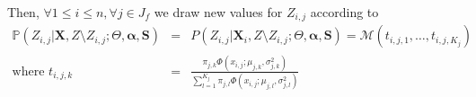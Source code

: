 \documentclass[12pt,a4paper]{report}
\begin{document}

	Then, $\forall 1\leq i \leq n, \forall j \in J_f$ we draw new values for $Z_{i,j}$ according to
	\begin{eqnarray}
		\mathbb{P}(Z_{i,j}|\boldsymbol{X},Z\setminus Z_{i,j};\Theta,\boldsymbol{\alpha},\boldsymbol{S})&=&P(Z_{i,j}|\boldsymbol{X}_i,Z\setminus Z_{i,j};\Theta,\boldsymbol{\alpha},\boldsymbol{S})=\mathcal{M}(t_{i,j,1},\dots ,t_{i,j,K_j})\ \  \nonumber\\
		\textrm{where } t_{i,j,k}&=&\frac{\pi_{j,k}\Phi(x_{i,j};\mu_{j,k},\sigma_{j,k}^2)}{\sum_{l=1}^{K_j}\pi_{j,l}\Phi(x_{i,j};\mu_{j,l},\sigma_{j,l}^2) } \nonumber 
	\end{eqnarray}
		
\end{document}
